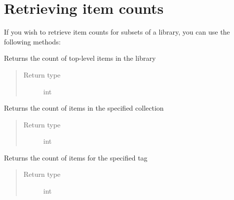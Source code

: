 \documentclass[letterpaper,10pt,english]{sphinxmanual}
\begin{document}
\section{Retrieving item counts}
\label{index:retrieving-item-counts}
If you wish to retrieve item counts for subsets of a library, you can use the following methods:

\begin{fulllineitems}
\label{index:pyzotero.zotero.Zotero.num_items}
Returns the count of top-level items in the library
\begin{quote}\begin{description}
\item[{Return type}] \leavevmode
int

\end{description}\end{quote}

\end{fulllineitems}


\begin{fulllineitems}
\label{index:pyzotero.zotero.Zotero.num_collectionitems}
Returns the count of items in the specified collection
\begin{quote}\begin{description}
\item[{Return type}] \leavevmode
int

\end{description}\end{quote}

\end{fulllineitems}


\begin{fulllineitems}
\label{index:pyzotero.zotero.Zotero.num_tagitems}
Returns the count of items for the specified tag
\begin{quote}\begin{description}
\item[{Return type}] \leavevmode
int

\end{description}\end{quote}

\end{fulllineitems}
\end{document}
